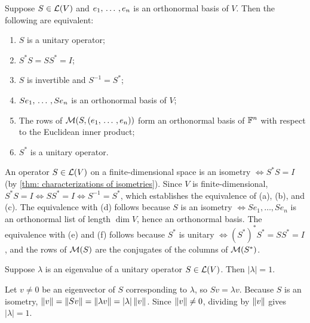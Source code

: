 \begin{thm}
  \label{thm: characterizations of unitary operators}
  Suppose $S \in \mathcal{L}(V)$ and $e_1, {\, \ldots \,\,}, e_n$ is an orthonormal basis of $V$. Then the following are equivalent:
  \begin{enumerate}[label=\textbf{(\alph*)}]
    \item $S$ is a unitary operator;
    \item $S^*S = SS^* = I$;
    \item $S$ is invertible and $S^{-1} = S^*$;
    \item $Se_1, {\, \ldots \,\,}, Se_n$ is an orthonormal basis of $V$;
    \item The rows of $\mathcal{M}(S,(e_1, {\, \ldots \,\,}, e_n))$ form an orthonormal basis of $\mathbb{F}^n$ with respect to the Euclidean inner product;
    \item $S^*$ is a unitary operator.
  \end{enumerate}
\end{thm}
\begin{prf}
  An operator $S \in \mathcal{L}(V)$ on a finite-dimensional space is an isometry $\iff S^*S = I$ (by \ref{thm: characterizations of isometries}).
  Since $V$ is finite-dimensional, $S^*S = I \iff SS^* = I \iff S^{-1} = S^*$, which establishes the equivalence of (a), (b), and (c).
  The equivalence with (d) follows because $S$ is an isometry $\iff Se_1, \dots, Se_n$ is an orthonormal list of length $\dim V$, hence an orthonormal basis.
  The equivalence with (e) and (f) follows because $S^*$ is unitary $\iff (S^*)^* S^* = S S^* = I$, and the rows of $\mathcal{M}(S)$ are the conjugates of the columns of $\mathcal{M}(S^*)$.
\end{prf}

\begin{thm}
  \label{thm: eigenvalues of unitary operators}
  Suppose $\lambda$ is an eigenvalue of a unitary operator $S \in \mathcal{L}(V)$. Then $|\lambda| = 1$.
\end{thm}
\begin{prf}
  Let $v \neq 0$ be an eigenvector of $S$ corresponding to $\lambda$, so $Sv = \lambda v$.
  Because $S$ is an isometry, $\left \lVert v \right \rVert = \left \lVert Sv \right \rVert = \left \lVert \lambda v \right \rVert = |\lambda| \left \lVert v \right \rVert$.
  Since $\left \lVert v \right \rVert \neq 0$, dividing by $\left \lVert v \right \rVert$ gives $|\lambda| = 1$.
\end{prf}

